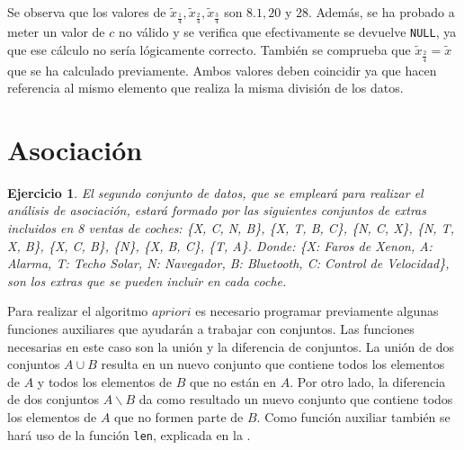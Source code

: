 \documentclass[12pt]{report}\usepackage[]{graphicx}\usepackage[dvipsnames]{xcolor}
\newtheorem{exercise}{Ejercicio}[section]
\begin{document}
			Se observa que los valores de $\tilde{x}_{\frac{1}{4}}, \tilde{x}_{\frac{2}{4}}, \tilde{x}_{\frac{3}{4}}$ son $8.1, 20$ y $28$. Además, se ha probado a meter un valor de $c$ no válido y se verifica que efectivamente se devuelve \texttt{NULL}, ya que ese cálculo no sería lógicamente correcto. También se comprueba que $\tilde{x}_{\frac{2}{4}} = \tilde{x}$ que se ha calculado previamente. Ambos valores deben coincidir ya que hacen referencia al mismo elemento que realiza la misma división de los datos.
			
		\section{Asociación}
		
			\begin{exercise}
				El segundo conjunto de datos, que se empleará para realizar el análisis de asociación, estará formado por las siguientes conjuntos de extras incluidos en 8 ventas de coches: \{X, C, N, B\}, \{X, T, B, C\}, \{N, C, X\}, \{N, T, X, B\}, \{X, C, B\}, \{N\}, \{X, B, C\}, \{T, A\}. Donde: \{X: Faros de Xenon, A: Alarma, T: Techo Solar, N: Navegador, B: Bluetooth, C: Control de Velocidad\}, son los extras que se pueden incluir en cada coche.
			\end{exercise}
			
			Para realizar el algoritmo $apriori$ es necesario programar previamente algunas funciones auxiliares que ayudarán a trabajar con conjuntos. Las funciones necesarias en este caso son la unión y la diferencia de conjuntos. La unión de dos conjuntos $A \cup B$ resulta en un nuevo conjunto que contiene todos los elementos de $A$ y todos los elementos de $B$ que no están en $A$. Por otro lado, la diferencia de dos conjuntos $A \backslash B$ da como resultado un nuevo conjunto que contiene todos los elementos de $A$ que no formen parte de $B$. Como función auxiliar también se hará uso de la función \texttt{len}, explicada en la .
			
\end{document}
